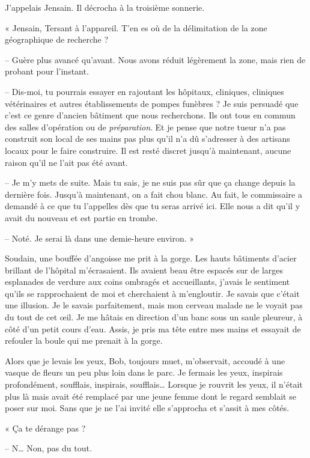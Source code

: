 J'appelais Jensain. Il décrocha à la troisième sonnerie.

« Jensain, Tersant à l'appareil. T'en es où de la délimitation de la zone géographique de recherche ?

-- Guère plus avancé qu'avant. Nous avons réduit légèrement la zone, mais rien de probant pour l'instant.

-- Dis-moi, tu pourrais essayer en rajoutant les hôpitaux, cliniques, cliniques vétérinaires et autres établissements 
de pompes funèbres ? Je suis persuadé que c'est ce genre d'ancien bâtiment que nous recherchons. Ils ont tous en commun 
des salles d'opération ou de \emph{préparation}. Et je pense que notre tueur n'a pas construit son local de ses mains 
pas plus qu'il n'a dû s'adresser à des artisans locaux pour le faire construire. Il est resté discret jusqu'à 
maintenant, aucune raison qu'il ne l'ait pas été avant.

-- Je m'y mets de suite. Mais tu sais, je ne suis pas sûr que ça change depuis la dernière fois. Jusqu'à maintenant, 
on a fait chou blanc. Au fait, le commissaire a demandé à ce que tu l'appelles dès que tu seras arrivé ici. Elle nous
a dit qu'il y avait du nouveau et est partie en trombe.

-- Noté. Je serai là dans une demie-heure environ. »

Soudain, une bouffée d'angoisse me prit à la gorge. Les hauts bâtiments d'acier brillant de l'hôpital m'écrasaient. Ils 
avaient beau être espacés sur de larges esplanades de verdure aux coins ombragés et accueillants, j'avais le sentiment 
qu'ils se rapprochaient de moi et cherchaient à m'engloutir. Je savais que c'était une illusion. Je le savais 
parfaitement, mais mon cerveau malade ne le voyait pas du tout de cet œil. Je me hâtais en direction d'un banc sous un 
saule pleureur, à côté d'un petit cours d'eau. Assis, je pris ma tête entre mes mains et essayait de refouler la 
boule qui me prenait à la gorge.

Alors que je levais les yeux, Bob, toujours muet, m'observait, accoudé à une vasque de fleurs un peu plus loin dans le 
parc. Je fermais les yeux, inspirais profondément, soufflais, inspirais, soufflais… Lorsque je rouvrit les yeux, il 
n'était plus là mais avait été remplacé par une jeune femme dont le regard semblait se poser sur moi. Sans que je ne 
l'ai invité elle s'approcha et s'assit à mes côtés.

« Ça te dérange pas ?

-- N… Non, pas du tout.

